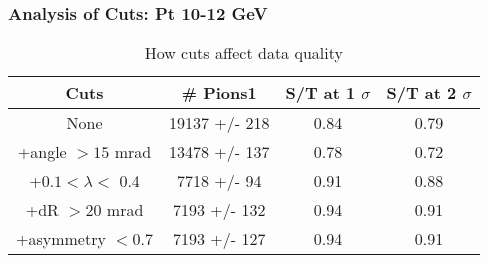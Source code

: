 \frame
{
\frametitle{Analysis of Cuts: Pt 10-12 GeV}
\begin{table}
\caption{How cuts affect data quality}
\centering
\begin{tabular}{c c c c}
\hline\hline
Cuts & \# Pions1 & S/T at 1 $\sigma$ & S/T at 2 $\sigma$ \\ [0.5ex]
\hline
None & 19137 +/-  218 & 0.84 & 0.79 \\ %
+angle $> 15$ mrad & 13478 +/-  137 & 0.78 & 0.72 \\ %
+$0.1 < \lambda <$ 0.4 & 7718 +/-   94 & 0.91 & 0.88 \\ %
+dR $> 20$ mrad & 7193 +/-  132 & 0.94 & 0.91 \\ %
+asymmetry $< 0.7$ & 7193 +/-  127 & 0.94 & 0.91 \\ %
[1ex]
\hline
\end{tabular}
\label{table:nonlin}
\end{table}
}
